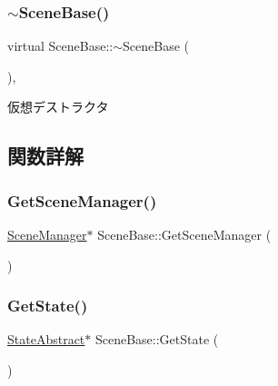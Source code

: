 \subsubsection{\texorpdfstring{$\sim$\+Scene\+Base()}{~SceneBase()}}
{\footnotesize\ttfamily virtual Scene\+Base\+::$\sim$\+Scene\+Base (\begin{DoxyParamCaption}{ }\end{DoxyParamCaption})\hspace{0.3cm}{\ttfamily [inline]}, {\ttfamily [virtual]}}



仮想デストラクタ 



\subsection{関数詳解}
\mbox{\label{class_scene_base_acb723e2ffac570209ce4f0c8ffd14ab1}} 
\subsubsection{\texorpdfstring{Get\+Scene\+Manager()}{GetSceneManager()}}
{\footnotesize\ttfamily \mbox{\hyperlink{class_scene_manager}{Scene\+Manager}}$\ast$ Scene\+Base\+::\+Get\+Scene\+Manager (\begin{DoxyParamCaption}{ }\end{DoxyParamCaption})\hspace{0.3cm}{\ttfamily [inline]}}

\mbox{\label{class_scene_base_a4d354583399a35400a5020e3d3628892}} 
\subsubsection{\texorpdfstring{Get\+State()}{GetState()}}
{\footnotesize\ttfamily \mbox{\hyperlink{class_scene_base_1_1_state_abstract}{State\+Abstract}}$\ast$ Scene\+Base\+::\+Get\+State (\begin{DoxyParamCaption}{ }\end{DoxyParamCaption})\hspace{0.3cm}{\ttfamily [inline]}}

